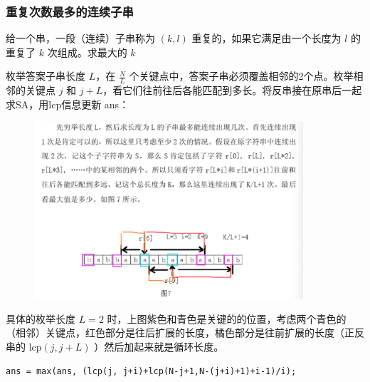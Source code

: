 \subsubsection{重复次数最多的连续子串}
\begin{tcolorbox}
\par \noindent 给一个串，一段（连续）子串称为 $(k,l)$ 重复的，如果它满足由一个长度为 $l$ 的重复了 $k$ 次组成。求最大的 $k$
\end{tcolorbox}
\par \noindent 枚举答案子串长度 $L$，在 $\frac{N} {L}$ 个关键点中，答案子串必须覆盖相邻的2个点。枚举相邻的关键点 $j$ 和 $j+L$，看它们往前往后各能匹配到多长。将反串接在原串后一起求SA，用lcp信息更新 ans：
\begin{figure}[H]
        \centering
        \par \includegraphics[width=10cm]{images/repeats.png}
\end{figure}
\par \noindent 具体的枚举长度 $L=2$ 时，上图紫色和青色是关键的的位置，考虑两个青色的（相邻）关键点，红色部分是往后扩展的长度，橘色部分是往前扩展的长度（正反串的 $\text{lcp}(j, j+L)$ ）然后加起来就是循环长度。

\begin{verbatim}
ans = max(ans, (lcp(j, j+i)+lcp(N-j+1,N-(j+i)+1)+i-1)/i);
\end{verbatim}

